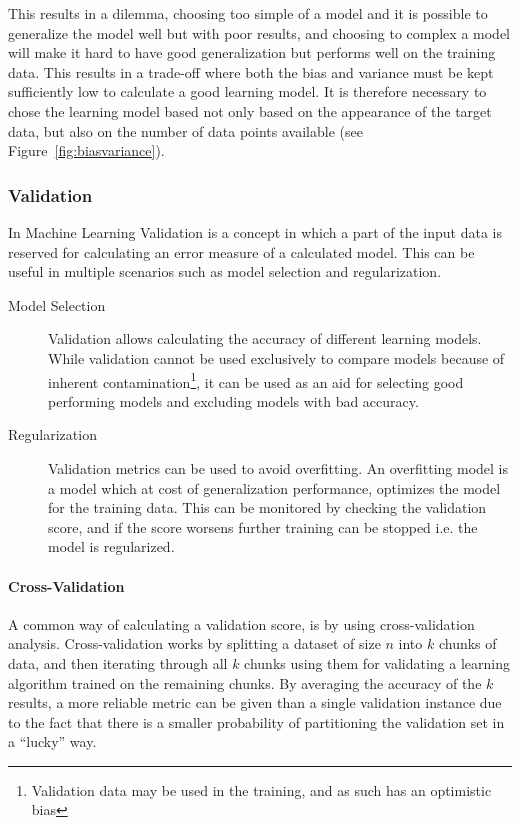 This results in a dilemma, choosing too simple of a model and it is possible to generalize the model well but with poor results, and choosing to
complex a model will make it hard to have good generalization but performs well on the training data.
This results in a trade-off where both the bias and variance must be kept sufficiently low to calculate a good learning model.
It is therefore necessary to chose the learning model based not only based on the appearance of the target data, but also on the number of data points available (see Figure~\ref{fig:biasvariance}).

\begin{minipage}{\linewidth}
\centering
{}
\label{fig:biasvariance}
\end{minipage}

\subsubsection{Validation}
\label{ssub:Validation}
In Machine Learning Validation is a concept in which a part of the input data is reserved for calculating an error measure of a calculated model.
This can be useful in multiple scenarios such as  model selection and regularization.
\begin{description}
  \item[Model Selection] Validation allows calculating the accuracy of different learning models.
    While validation cannot be used exclusively to compare models because of inherent contamination\footnote{Validation data may be used in the training, and as such has an optimistic bias\cite{learningfromdata2012book}},
    it can be used as an aid for selecting good performing models and excluding models with bad accuracy.
  \item[Regularization] Validation metrics can be used to avoid overfitting.
    An overfitting model is a model which at cost of generalization performance, optimizes the model for the training data.
    This can be monitored by checking the validation score, and if the score worsens further training can be stopped i.e. the model is regularized.
\end{description}
\paragraph{Cross-Validation}
\label{par:Cross-Validation}
A common way of calculating a validation score, is by using cross-validation analysis. Cross-validation works by splitting a dataset of size $n$ into $k$ chunks of data, and then
iterating through all $k$ chunks using them for validating a learning algorithm trained on the remaining chunks. 
By averaging the accuracy of the $k$ results, a more reliable metric can be given than a single validation instance due to the fact that there is a smaller probability of
partitioning the validation set in a ``lucky'' way.

